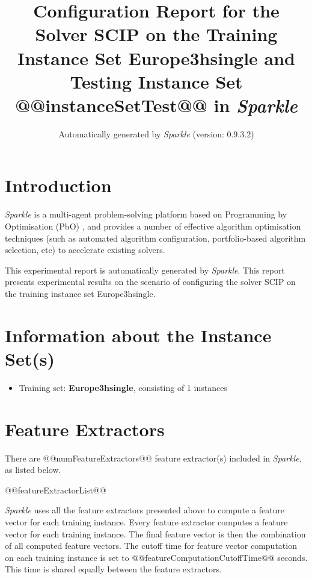 \documentclass[british]{article}
\title{Configuration Report for the Solver SCIP on the Training Instance Set Europe\textunderscore 3h\textunderscore single \iftest and Testing Instance Set @@instanceSetTest@@ \fi in \emph{Sparkle} }
\author{ Automatically generated by \emph{Sparkle} (version: 0.9.3.2) }
\newif\iftest
\newif\iffeatures
\begin{document}
\maketitle %


\section{Introduction}
\label{sec:Introduction}

\emph{Sparkle} \cite{Hoos15} is a multi-agent problem-solving platform based on Programming by Optimisation (PbO) \cite{Hoos12}, and provides a number of effective algorithm optimisation techniques (such as automated algorithm configuration, portfolio-based algorithm selection, etc) to accelerate existing solvers.

This experimental report is automatically generated by \emph{Sparkle}. This report presents experimental results on the scenario of configuring the solver SCIP on the training instance set Europe\textunderscore 3h\textunderscore single\iftest~and evaluating it on the testing instance set @@instanceSetTest@@\fi.


\section{Information about the Instance Set(s)}

\begin{itemize}
\item Training set: \textbf{Europe\textunderscore 3h\textunderscore single}, consisting of 1 instances
\iftest\item \textbf{@@instanceSetTest@@}, consisting of @@numInstanceInTestingInstanceSet@@ instances\fi
\end{itemize}


\iffeatures
    \section{Feature Extractors}
        There are @@numFeatureExtractors@@ feature extractor(s) included in \emph{Sparkle}, as listed below.

        \begin{enumerate}
        @@featureExtractorList@@
        \end{enumerate}

        \emph{Sparkle} uses all the feature extractors presented above to compute a feature vector for each training instance. Every feature extractor computes a feature vector for each training instance. The final feature vector is then the combination of all computed feature vectors. The cutoff time for feature vector computation on each training instance is set to @@featureComputationCutoffTime@@ seconds. This time is shared equally between the feature extractors.
\end{document}
